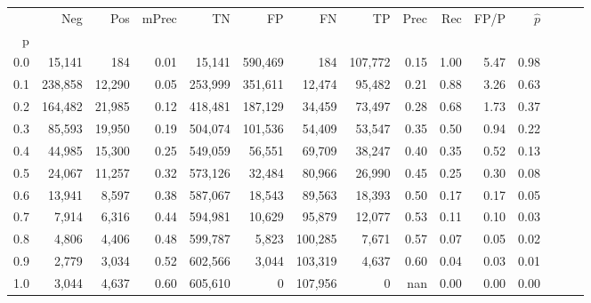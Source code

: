 \begin{tabular}{rrrrrrrrrrrrrrr}
\toprule
{} &      Neg &     Pos & mPrec &       TN &       FP &       FN &       TP &  Prec &   Rec &  FP/P & $\hat{p}$ \\
p   &          &         &       &          &          &          &          &       &       &       &           \\
\midrule
0.0 &   15,141 &     184 &  0.01 &   15,141 &  590,469 &      184 &  107,772 &  0.15 &  1.00 &  5.47 &      0.98 \\
0.1 &  238,858 &  12,290 &  0.05 &  253,999 &  351,611 &   12,474 &   95,482 &  0.21 &  0.88 &  3.26 &      0.63 \\
0.2 &  164,482 &  21,985 &  0.12 &  418,481 &  187,129 &   34,459 &   73,497 &  0.28 &  0.68 &  1.73 &      0.37 \\
0.3 &   85,593 &  19,950 &  0.19 &  504,074 &  101,536 &   54,409 &   53,547 &  0.35 &  0.50 &  0.94 &      0.22 \\
0.4 &   44,985 &  15,300 &  0.25 &  549,059 &   56,551 &   69,709 &   38,247 &  0.40 &  0.35 &  0.52 &      0.13 \\
0.5 &   24,067 &  11,257 &  0.32 &  573,126 &   32,484 &   80,966 &   26,990 &  0.45 &  0.25 &  0.30 &      0.08 \\
0.6 &   13,941 &   8,597 &  0.38 &  587,067 &   18,543 &   89,563 &   18,393 &  0.50 &  0.17 &  0.17 &      0.05 \\
0.7 &    7,914 &   6,316 &  0.44 &  594,981 &   10,629 &   95,879 &   12,077 &  0.53 &  0.11 &  0.10 &      0.03 \\
0.8 &    4,806 &   4,406 &  0.48 &  599,787 &    5,823 &  100,285 &    7,671 &  0.57 &  0.07 &  0.05 &      0.02 \\
0.9 &    2,779 &   3,034 &  0.52 &  602,566 &    3,044 &  103,319 &    4,637 &  0.60 &  0.04 &  0.03 &      0.01 \\
1.0 &    3,044 &   4,637 &  0.60 &  605,610 &        0 &  107,956 &        0 &   nan &  0.00 &  0.00 &      0.00 \\
\bottomrule
\end{tabular}
